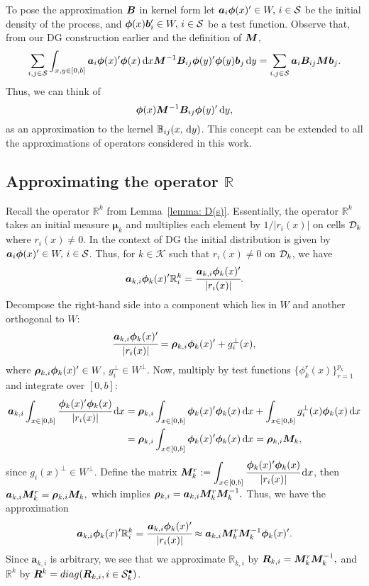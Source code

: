 To pose the approximation \(\boldsymbol B\) in kernel form let \(\boldsymbol a_i \boldsymbol \phi(x)'{}\in W,\,i\in\mathcal{S}\) be the initial density of the process, and \(\boldsymbol \phi(x)\boldsymbol b_i'{}\in W,\,i\in\mathcal{S}\) be a test function. Observe that, from our DG construction earlier and the definition of \({\boldsymbol M}\), 
\[\sum_{i,j\in\mathcal{S}}\int_{x,y\in[0,b]} \boldsymbol a_i \boldsymbol \phi(x)'{} \boldsymbol \phi (x) \, \mathrm{d} x {\boldsymbol M}^{-1}{  \boldsymbol B}_{ij} \boldsymbol \phi(y)'{} \boldsymbol \phi(y)\boldsymbol b_j \, \mathrm{d} y= \sum_{i,j\in\mathcal{S}} \boldsymbol a_i {  \boldsymbol B}_{ij} {\boldsymbol M} \boldsymbol b_j .\]
Thus, we can think of 
\[\boldsymbol \phi (x) {\boldsymbol M}^{-1}{  \boldsymbol B}_{ij} \boldsymbol \phi(y)'{}\, \mathrm{d} y,\]
as an approximation to the kernel \(\mathbb B_{ij}(x,\, \mathrm{d} y)\). This concept can be extended to all the approximations of operators considered in this work. 

\subsection{Approximating the operator \(\mathbb R\)}\label{sec: approx r}
Recall the operator \(\mathbb R^k\) from Lemma~\ref{lemma: D(s)}. Essentially, the operator \(\mathbb R^k\) takes an initial measure \(\boldsymbol \mu_k\) and multiplies each element by \(1/|r_i(x)|\) on cells \(\mathcal{D}_k\) where \(r_i(x)\neq 0\). In the context of DG the initial distribution is given by \(\boldsymbol a_i \boldsymbol \phi(x)'{}\in W,\,i\in\mathcal{S}\). Thus, for \(k\in\mathcal K\) such that \(r_i(x)\neq0\) on \(\mathcal{D}_k\), we have 
\[\boldsymbol a_{k,i} \boldsymbol \phi_k(x)'{}\mathbb R^k_i = \cfrac{\boldsymbol a_{k,i} \boldsymbol \phi_k(x)'{}}{|r_i(x)|}.\]
Decompose the right-hand side into a component which lies in \(W\) and another orthogonal to \(W\): 
\[\cfrac{\boldsymbol a_{k,i} \boldsymbol \phi_k(x)'{}}{|r_i(x)|} = \boldsymbol \rho_{k,i} \boldsymbol \phi_k(x)'{} + g_i^\perp(x),\] where \(\boldsymbol \rho_{k,i} \boldsymbol\phi_k(x)'{}\in W\), \(g_i^\perp \in W^\perp\). Now, multiply by test functions \(\{\phi^r_k(x)\}_{r=1}^{p_k}\) and integrate over \([0,b]\):
\begin{align*}
	\boldsymbol a_{k,i}\int_{x\in[0,b]} \cfrac{ \boldsymbol \phi_k(x)'{}\boldsymbol \phi_k(x)}{|r_i(x)|}\, \mathrm{d} x
	&=\boldsymbol \rho_{k,i} \int_{x\in[0,b]}\boldsymbol \phi_k(x)'{}\boldsymbol \phi_k(x)\, \mathrm{d} x + \int_{x\in[0,b]} g_i^\perp(x)\boldsymbol\phi_k(x)\, \mathrm{d} x 
	\\&= \boldsymbol \rho_{k,i} \int_{x\in[0,b]}\boldsymbol \phi_k(x)'{}\boldsymbol \phi_k(x)\, \mathrm{d} x = \boldsymbol \rho_{k,i}\boldsymbol M_k,
\end{align*}
since \(g_i(x)^\perp\in W^\perp\). Define the matrix \(\boldsymbol M_k^r := \displaystyle\int_{x\in[0,b]} \cfrac{ \boldsymbol \phi_k(x)'{}\boldsymbol \phi_k(x)}{|r_i(x)|}\, \mathrm{d} x\), then 
\(
	\boldsymbol a_{k,i}\boldsymbol M_k^r
	= \boldsymbol \rho_{k,i} \boldsymbol M_k,
\)
which implies
\(
	\boldsymbol \rho_{k,i}  = \boldsymbol a_{k,i}\boldsymbol M_k^r\boldsymbol M_k^{-1}.
\)
Thus, we have the approximation 
\[\boldsymbol a_{k,i} \boldsymbol \phi_k(x)'{}\mathbb R^k_i = \cfrac{\boldsymbol a_{k,i} \boldsymbol \phi_k(x)'{}}{|r_i(x)|}\approx \boldsymbol a_{k,i}\boldsymbol M_k^r\boldsymbol M_k^{-1}\boldsymbol\phi_k(x)'{}.\]
Since \(\boldsymbol a_{k,i}\) is arbitrary, we see that we approximate \(\mathbb R_{k,i}\) by \(  \boldsymbol R_{k,i} = \boldsymbol M_k^r\boldsymbol M_k^{-1},\)
and \(\mathbb R^k\) by \(  \boldsymbol R^k = diag(  \boldsymbol R_{k,i},{i\in\mathcal{S}^\bullet_k})\).

